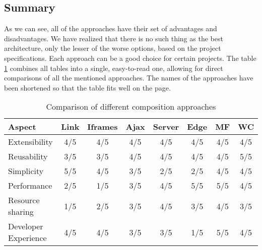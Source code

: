 \subsection{Summary}
As we can see, all of the approaches have their set of advantages and disadvantages. We have realized that there is no such thing as the best architecture, only the lesser of the worse options, based on the project specifications. Each approach can be a good choice for certain projects. The table \ref{table:composition-comparison} combines all tables into a single, easy-to-read one, allowing for direct comparisons of all the mentioned approaches. The names of the approaches have been shortened so that the table fits well on the page.
\begin{table}[h]
  \centering
  \begin{tabular}{|p{3cm}|c|c|c|c|c|c|c|}
    \hline
      \textbf{Aspect} & \textbf{Link} & \textbf{Iframes} & \textbf{Ajax} & \textbf{Server} & \textbf{Edge} & \textbf{MF} & \textbf{WC} \\
    \hline
      Extensibility & 4/5 & 4/5 & 4/5 & 4/5 & 4/5 & 4/5 & 4/5 \\
    \hline
      Reusability & 3/5 & 3/5 & 4/5 & 4/5 & 4/5 & 4/5 & 5/5 \\
    \hline
      Simplicity & 5/5 & 4/5 & 3/5 & 2/5 & 2/5 & 4/5 & 4/5 \\
    \hline
      Performance & 2/5 & 1/5 & 3/5 & 4/5 & 5/5 & 5/5 & 4/5 \\
    \hline
      Resource sharing & 1/5 & 2/5 & 3/5 & 4/5 & 3/5 & 4/5 & 3/5 \\
    \hline
      Developer Experience & 4/5 & 4/5 & 3/5 & 3/5 & 1/5 & 5/5 & 4/5 \\
    \hline
  \end{tabular}
  \caption{Comparison of different composition approaches}
  \label{table:composition-comparison}
\end{table}


